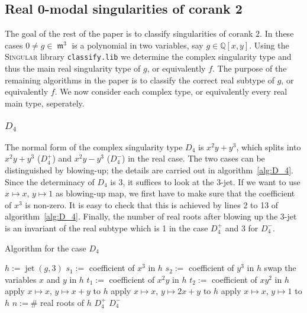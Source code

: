\documentclass[noend]{amsproc}
\theoremstyle{definition}
\DeclareMathOperator{\m}{\mathfrak{m}}
\DeclareMathOperator{\jt}{jet}
\begin{document}
\subsection{Real $\mathbf 0$-modal singularities of corank $\mathbf 2$}
The goal of the rest of the paper is to classify singularities of corank $2$.
In these cases $0\neq g\in\m^3$ is a polynomial in two variables, say
$g\in\mathbb Q[x,y]$. Using the \textsc{Singular} library {\tt classify.lib} we
determine the complex singularity type and thus the main real singularity type
of $g$, or equivalently $f$. The purpose of the remaining algorithms in the
paper is to classify the correct real subtype of $g$, or equivalently $f$. We
now consider each complex type, or equivalently every real main type,
seperately.

\subsubsection{$D_4$}

The normal form of the complex singularity type $D_4$ is $x^2y+y^3$, which
splits into $x^2y+y^3$ ($D_4^+$) and $x^2y-y^3$ ($D_4^-$) in the real case.
The two cases can be distinguished by blowing-up; the details are carried out
in algorithm~\ref{alg:D_4}. Since the determinacy of
$D_4$ is $3$, it suffices to look at the $3$-jet. If we want to use
$x \mapsto x$, $y \mapsto 1$ as blowing-up map, we first have to make sure that
the coefficient of $x^3$ is non-zero. It is easy to check that this is achieved
by lines 2 to 13 of algorithm~\ref{alg:D_4}. Finally, the number of real roots
after blowing up the 3-jet is an invariant of the real subtype which is 1 in
the case $D_4^+$ and 3 for $D_4^-$.

\begin{algorithm}[h]
\caption{\label{alg:D_4}\label{D[4]} Algorithm for the case $D_4$}
\begin{algorithmic}[1]

\REQUIRE{$g\in \m^3\subset\mathbb Q[x,y]$ of complex singularity type $D_4$}
\STATE $h := \jt(g,3)$
\STATE $s_1:=$ coefficient of ${x^3}$ in $h$
\STATE $s_2 :=$ coefficient of ${y^3}$ in $h$
\STATE swap the variables $x$ and $y$ in $h$
\ELSE
\STATE $t_1:=$ coefficient of ${x^2y}$ in $h$
\STATE $t_2:=$ coefficient of ${xy^2}$ in $h$
\STATE apply $x\mapsto x$, $y\mapsto x+y$ to $h$
\ELSE
\STATE apply $x\mapsto x$, $y\mapsto 2x+y$ to $h$
\ENDIF
\ENDIF
\ENDIF
\STATE apply $x\mapsto x$, $y\mapsto 1$ to $h$
\STATE $n:= \#$ real roots of $h$
\RETURN $D_4^+$
\ELSE
\RETURN $D_4^-$
\ENDIF

\end{algorithmic}
\end{algorithm}
\end{document}
